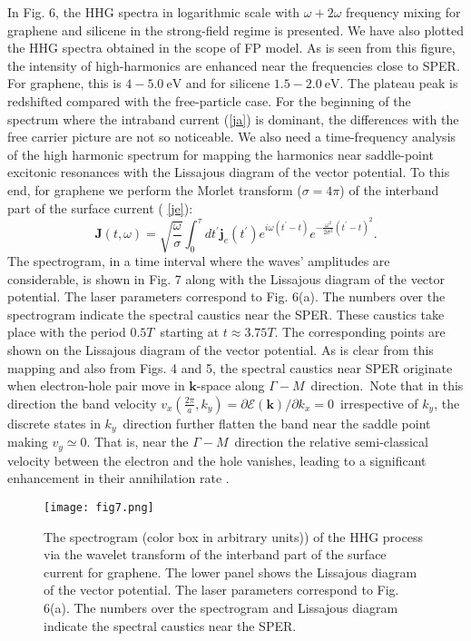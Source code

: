 \documentclass[reprint, superscriptaddress,  aps, pra]{revtex4-2}
\begin{document}
In Fig. 6, the HHG spectra in logarithmic scale with $\omega +2\omega $
frequency mixing for graphene and silicene in the strong-field regime is
presented. We have also plotted the HHG spectra obtained in the scope of FP
model. As is seen from this figure, the intensity of high-harmonics are
enhanced near the frequencies close to SPER. For graphene, this is $4-5.0\ 
\mathrm{eV}$ and for silicene $1.5-2.0\ \mathrm{eV}$. The plateau peak is
redshifted compared with the free-particle case. For the beginning of the
spectrum where the intraband current (\ref{ja}) is dominant, the differences
with the free carrier picture are not so noticeable. We also need a
time-frequency analysis of the high harmonic spectrum for mapping the
harmonics near saddle-point excitonic resonances with the Lissajous diagram
of the vector potential. To this end, for graphene we perform the Morlet
transform ($\sigma =4\pi $) of the interband part of the surface current (%
\ref{je}): 
\begin{equation}
\mathbf{J}\left( t,\omega \right) =\sqrt{\frac{\omega }{\sigma }}%
\int_{0}^{\tau }dt^{\prime }\mathbf{j}_{e}\left( t^{\prime }\right)
e^{i\omega \left( t^{\prime }-t\right) }e^{-\frac{\omega ^{2}}{2\sigma ^{2}}%
\left( t^{\prime }-t\right) ^{2}}.  \label{wavelet}
\end{equation}%
The spectrogram, in a time interval where the waves' amplitudes are
considerable, is shown in Fig. 7 along with the Lissajous diagram of the
vector potential. The laser parameters correspond to Fig. 6(a). The numbers
over the spectrogram indicate the spectral caustics near the SPER. These
caustics take place with the period $0.5T$\ starting at $t\approx 3.75T$.
The corresponding points are shown on the Lissajous diagram of the vector
potential. As is clear from this mapping and also from Figs. 4 and 5, the
spectral caustics near SPER originate when electron-hole pair move in $%
\mathbf{k}$-space along $\Gamma -M$\ direction.\textrm{\ }Note that in this
direction the band velocity $v_{x}\left( \frac{2\pi }{a},k_{y}\right)
=\partial \mathcal{E}\left( \mathbf{k}\right) /\partial k_{x}=0$\
irrespective of $k_{y}$, the discrete states in $k_{y}$\ direction further
flatten the band near the saddle point making $v_{y}\simeq 0$. That is, near
the $\Gamma -M$\ direction the relative semi-classical velocity between the
electron and the hole vanishes, leading to a significant enhancement in
their annihilation rate \cite{Uzan-Ivanov}. 
\begin{figure}[tbp]
\texttt{[image: fig7.png]}
\caption{The spectrogram (color box in arbitrary units)) of the HHG process
via the wavelet transform of the interband part of the surface current for
graphene. The lower panel shows the Lissajous diagram of the vector
potential. The laser parameters correspond to Fig. 6(a). The numbers over
the spectrogram and Lissajous diagram indicate the spectral caustics near
the SPER.}
\end{figure}
\end{document}
